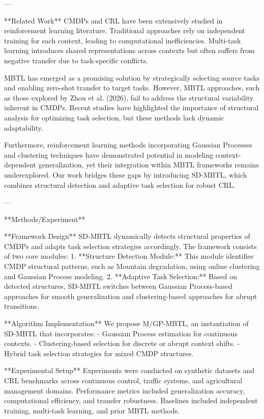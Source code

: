 ---

**Related Work**  
CMDPs and CRL have been extensively studied in reinforcement learning literature. Traditional approaches rely on independent training for each context, leading to computational inefficiencies. Multi-task learning introduces shared representations across contexts but often suffers from negative transfer due to task-specific conflicts.  

MBTL has emerged as a promising solution by strategically selecting source tasks and enabling zero-shot transfer to target tasks. However, MBTL approaches, such as those explored by Zhou et al. (2026), fail to address the structural variability inherent in CMDPs. Recent studies have highlighted the importance of structural analysis for optimizing task selection, but these methods lack dynamic adaptability.  

Furthermore, reinforcement learning methods incorporating Gaussian Processes and clustering techniques have demonstrated potential in modeling context-dependent generalization, yet their integration within MBTL frameworks remains underexplored. Our work bridges these gaps by introducing SD-MBTL, which combines structural detection and adaptive task selection for robust CRL.

---

**Methods/Experiment**  

**Framework Design**  
SD-MBTL dynamically detects structural properties of CMDPs and adapts task selection strategies accordingly. The framework consists of two core modules:  
1. **Structure Detection Module:** This module identifies CMDP structural patterns, such as Mountain degradation, using online clustering and Gaussian Process modeling.  
2. **Adaptive Task Selection:** Based on detected structures, SD-MBTL switches between Gaussian Process-based approaches for smooth generalization and clustering-based approaches for abrupt transitions.

**Algorithm Implementation**  
We propose M/GP-MBTL, an instantiation of SD-MBTL that incorporates:
- Gaussian Process estimation for continuous contexts.  
- Clustering-based selection for discrete or abrupt context shifts.  
- Hybrid task selection strategies for mixed CMDP structures.  

**Experimental Setup**  
Experiments were conducted on synthetic datasets and CRL benchmarks across continuous control, traffic systems, and agricultural management domains. Performance metrics included generalization accuracy, computational efficiency, and transfer robustness. Baselines included independent training, multi-task learning, and prior MBTL methods.

